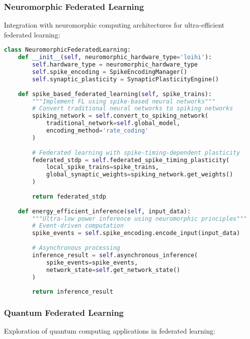 \subsubsection{Neuromorphic Federated Learning}

Integration with neuromorphic computing architectures for ultra-efficient federated learning:

\begin{lstlisting}[language=python, caption=Neuromorphic FL Architecture]
class NeuromorphicFederatedLearning:
    def __init__(self, neuromorphic_hardware_type='loihi'):
        self.hardware_type = neuromorphic_hardware_type
        self.spike_encoding = SpikeEncodingManager()
        self.synaptic_plasticity = SynapticPlasticityEngine()
        
    def spike_based_federated_learning(self, spike_trains):
        """Implement FL using spike-based neural networks"""
        # Convert traditional neural networks to spiking networks
        spiking_network = self.convert_to_spiking_network(
            traditional_network=self.global_model,
            encoding_method='rate_coding'
        )
        
        # Federated learning with spike-timing-dependent plasticity
        federated_stdp = self.federated_spike_timing_plasticity(
            local_spike_trains=spike_trains,
            global_synaptic_weights=spiking_network.get_weights()
        )
        
        return federated_stdp
        
    def energy_efficient_inference(self, input_data):
        """Ultra-low power inference using neuromorphic principles"""
        # Event-driven computation
        spike_events = self.spike_encoding.encode_input(input_data)
        
        # Asynchronous processing
        inference_result = self.asynchronous_inference(
            spike_events=spike_events,
            network_state=self.get_network_state()
        )
        
        return inference_result
\end{lstlisting}

\subsubsection{Quantum Federated Learning}

Exploration of quantum computing applications in federated learning:

